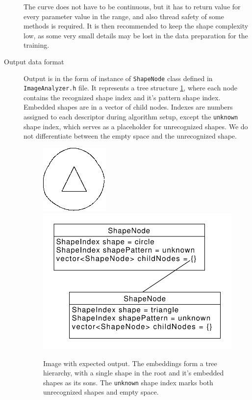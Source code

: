 \begin{description}
The curve does not have to be continuous, but it has to return value for every parameter value in the range, and also thread safety of some methods is required. It is then recommended to keep the shape complexity low, as some very small details may be lost in the data preparation for the training. 

\item [Output data format]
Output is in the form of instance of \texttt{ShapeNode} class defined in \texttt{ImageAnalyzer.h} file. It represents a tree structure \ref{output0}, where each node contains the recognized shape index and it's pattern shape index. Embedded shapes are in a vector of child nodes. Indexes are numbers assigned to each descriptor during algorithm setup, except the \texttt{unknown} shape index, which serves as a placeholder for unrecognized shapes. We do not differentiate between the empty space and the unrecognized shape.

\begin{figure}
\centering
\includegraphics[width=.3\linewidth]{ext/images/example_output0.png}
\quad
\includegraphics[width=.3\linewidth]{ext/images/example_output0.pdf}
\caption{Image with expected output. The embeddings form a tree hierarchy, with a single shape in the root and it's embedded shapes as its sons. The \texttt{unknown} shape index marks both unrecognized shapes and empty space.}
\label{output0}
\end{figure}


\end{description}
